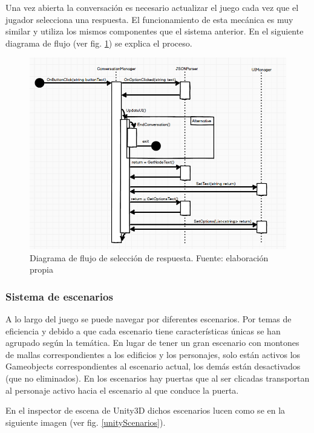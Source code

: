 Una vez abierta la conversación es necesario actualizar el juego cada vez que el jugador selecciona una respuesta. El funcionamiento de esta mecánica es muy similar y utiliza los mismos componentes que el sistema anterior.
En el siguiente diagrama de flujo (ver fig. \ref{respuestaFlujo}) se explica el proceso.

\begin{figure}
\begin{center}
\includegraphics[scale=0.55]{imagenes/respuestaFlujo.png}
\caption{Diagrama de flujo de selección de respuesta.  Fuente: elaboración propia}
\label{respuestaFlujo}
\end{center}
\end{figure}

\subsubsection{Sistema de escenarios}

A lo largo del juego se puede navegar por diferentes escenarios. Por temas de eficiencia y debido a que cada escenario tiene características únicas se han agrupado según la temática. En lugar de tener un gran escenario con montones de mallas correspondientes a los edificios y los personajes, solo están activos los Gameobjects correspondientes al escenario actual, los demás están desactivados (que no eliminados). En los escenarios hay puertas que al ser clicadas transportan al personaje activo hacia el escenario al que conduce la puerta. 

En el inspector de escena de Unity3D dichos escenarios lucen como se en la siguiente imagen (ver fig. \ref{unityScenarios}).

